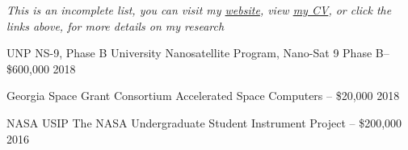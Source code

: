 \documentclass[10pt,a4paper]{article}
\begin{document}
\begin{center}
  \emph{\small This is an incomplete list, you can visit my \href{http://calebadams.space}{website}, view \href{http://piepieninja.github.io/cv/}{my CV}, or click the links above, for more details on my research}
\end{center}


\spacedhrule{0.5em}{-0.4em}

\vspace{-0.2em}

\headedsection
  {{UNP NS-9, Phase B}}
  {%
  \headedsubsection
    {University Nanosatellite Program, Nano-Sat 9 Phase B-- \$600,000}
    {2018}
    {
    }
}


\headedsection
  {{Georgia Space Grant Consortium}}
  {%
  \headedsubsection
    {Accelerated Space Computers -- \$20,000}
    {2018}
    {
    }
}



\headedsection
  {{NASA USIP}}
  {%
  \headedsubsection
    {The NASA Undergraduate Student Instrument Project -- \$200,000}
    {2016}
    {
    }
}
\end{document}
